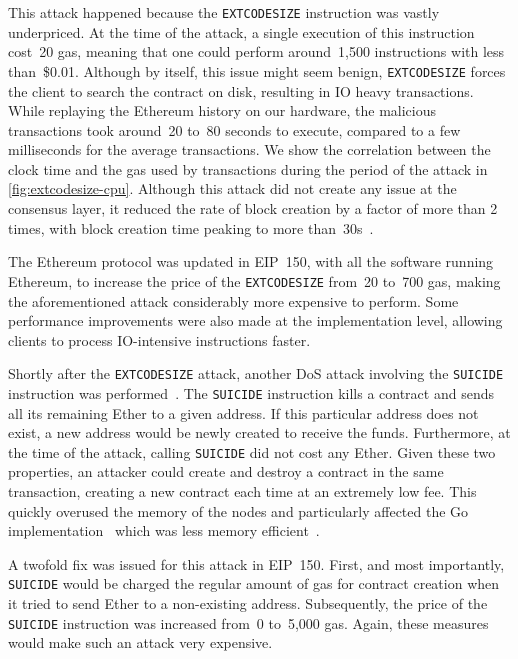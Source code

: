 This attack happened because the \lstinline{EXTCODESIZE} instruction was vastly underpriced.
At the time of the attack, a single execution of this instruction cost~20 gas, meaning that one could perform around~1,500 instructions with less than~\$0.01.
Although by itself, this issue might seem benign, \lstinline{EXTCODESIZE} forces the client to search the contract on disk, resulting in IO heavy transactions.
While replaying the Ethereum history on our hardware, the malicious transactions took around~20 to~80 seconds to execute, compared to a few milliseconds for the average transactions. We show the correlation between the clock time and the gas used by transactions during the period of the attack in \autoref{fig:extcodesize-cpu}.
Although this attack did not create any issue at the consensus layer, it reduced the rate of block creation by a factor of more than 2 times, with block creation time peaking to more than~30s~\cite{block-time-chart}.

The Ethereum protocol was updated in EIP~150, with all the software running Ethereum, to increase the price of the \lstinline{EXTCODESIZE} from~20 to~700 gas, making the aforementioned attack considerably more expensive to perform. Some performance improvements were also made at the implementation level, allowing clients to process IO-intensive instructions faster.

Shortly after the \lstinline{EXTCODESIZE} attack, another DoS attack involving the \lstinline{SUICIDE} instruction was performed~\cite{suicide-attack}. The \lstinline{SUICIDE} instruction kills a contract and sends all its remaining Ether to a given address. If this particular address does not exist, a new address would be newly created to receive the funds. Furthermore, at the time of the attack, calling \lstinline{SUICIDE} did not cost any Ether. Given these two properties, an attacker could create and destroy a contract in the same transaction, creating a new contract each time at an extremely low fee. This quickly overused the memory of the nodes and particularly affected the Go implementation~\cite{geth} which was less memory efficient~\cite{geth-memory-efficiency}.

A twofold fix was issued for this attack in EIP~150. First, and most importantly, \lstinline{SUICIDE} would be charged the regular amount of gas for contract creation when it tried to send Ether to a non-existing address. Subsequently, the price of the \lstinline{SUICIDE} instruction was increased from~0 to~5,000 gas. Again, these measures would make such an attack very expensive.

